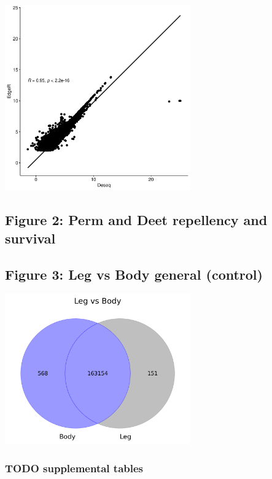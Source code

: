\documentclass[11pt]{article}
\begin{document}
\begin{center}
\includegraphics[width=0.6\textwidth]{figure1/pearson.png}
\end{center}
\subsection{Figure 2: Perm and Deet repellency and survival}
\label{sec:org60543b7}
\subsection{Figure 3: Leg vs Body general (control)}
\label{sec:orgce86978}
\begin{center}
\includegraphics[width=0.6\textwidth]{figure3/Deseq-BodyvsLeg.png}
\end{center}
\subsubsection{{\bfseries\sffamily TODO} supplemental tables}
\label{sec:org18f899d}
\end{document}
